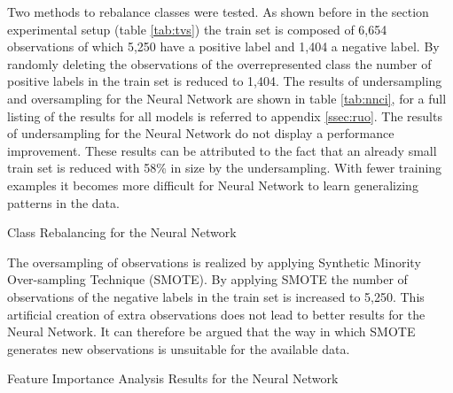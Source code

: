 Two methods to rebalance classes were tested. 
As shown before in the section experimental setup (table \ref{tab:tvs}) the train set is composed of 6,654 observations of which 5,250 have a positive label and 1,404 a negative label.
By randomly deleting the observations of the overrepresented class the number of positive labels in the train set is reduced to 1,404.
The results of undersampling and oversampling for the Neural Network are shown in table \ref{tab:nnci}, for a full listing of the results for all models is referred to appendix \ref{ssec:ruo}.
The results of undersampling for the Neural Network do not display a performance improvement.
These  results can be attributed to the fact that an already small train set is reduced with 58\% in size by the undersampling.
With fewer training examples it becomes more difficult for Neural Network to learn generalizing patterns in the data.

\begin{table}[h]
\begin{footnotesize}

\end{footnotesize}
\caption{\footnotesize{\label{tab:nnci} Class Rebalancing for the Neural Network}}
\end{table}

The oversampling of observations is realized by applying Synthetic Minority Over-sampling Technique (SMOTE). 
By applying SMOTE the number of observations of the negative labels in the train set is increased to 5,250. 
This artificial creation of extra observations does not lead to better results for the Neural Network.
It can therefore be argued that the way in which SMOTE generates new observations is unsuitable for the available data.

\begin{table}[h]
\begin{footnotesize}

\end{footnotesize}
\caption{\label{tab:nnfi} \footnotesize{Feature Importance Analysis Results for the Neural Network}}
\end{table}

